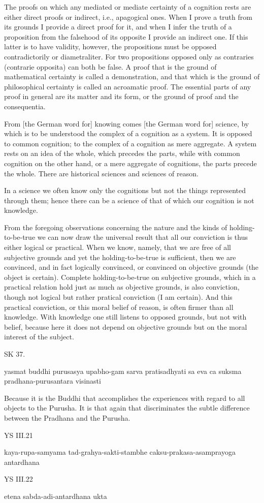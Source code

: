     The proofs on which any mediated or mediate certainty of a cognition
    rests are either direct proofs or indirect, i.e., apagogical ones.
    When I prove a truth from its grounds I provide a direct proof for it,
    and when I infer the truth of a proposition from the falsehood of its
    opposite I provide an indirect one.
    If this latter is to have validity, however,
    the propositions must be opposed contradictorily or diametraliter.
    For two propositions opposed only as contraries
    (contrarie opposita) can both be false.
    A proof that is the ground of mathematical certainty
    is called a demonstration,
    and that which is the ground of philosophical certainty
    is called an acroamatic proof.
    The essential parts of any proof in general are
    its matter and its form,
    or the ground of proof and the consequentia.

    From [the German word for] knowing comes [the German word for] science,
    by which is to be understood the complex of a cognition as a system.
    It is opposed to common cognition;
    to the complex of a cognition as mere aggregate.
    A system rests on an idea of the whole,
    which precedes the parts,
    while with common cognition on the other hand,
    or a mere aggregate of cognitions,
    the parts precede the whole.
    There are historical sciences and sciences of reason.

    In a science we often know only the cognitions
    but not the things represented through them;
    hence there can be a science of that
    of which our cognition is not knowledge.

    From the foregoing observations concerning
    the nature and the kinds of holding-to-be-true
    we can now draw the universal result that
    all our conviction is thus either logical or practical.
    When we know, namely, that we are free of all subjective grounds
    and yet the holding-to-be-true is sufficient,
    then we are convinced, and in fact logically convinced, or
    convinced on objective grounds (the object is certain).
    Complete holding-to-be-true on subjective grounds,
    which in a practical relation hold just as much as objective grounds,
    is also conviction, though not logical
    but rather pratical conviction (I am certain).
    And this practical conviction, or this moral belief of reason,
    is often firmer than all knowledge.
    With knowledge one still listens to opposed grounds,
    but not with belief, because here it does not depend on
    objective grounds but on the moral interest of the subject.

SK 37.

yasmat buddhi purusasya upabho-gam sarva pratisadhyati
sa eva ca suksma pradhana-purusantara visinasti

Because it is the Buddhi that accomplishes the experiences
with regard to all objects to the Purusha.
It is that again that discriminates the subtle difference
between the Pradhana and the Purusha.

YS III.21

    kaya-rupa-samyama tad-grahya-sakti-stambhe
    caksu-prakasa-asamprayoga antardhana

YS III.22

    etena sabda-adi-antardhana ukta
